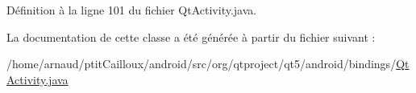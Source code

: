 Définition à la ligne 101 du fichier Qt\-Activity.\-java.



La documentation de cette classe a été générée à partir du fichier suivant \-:\begin{DoxyCompactItemize}
\item 
/home/arnaud/ptit\-Cailloux/android/src/org/qtproject/qt5/android/bindings/\hyperlink{_qt_activity_8java}{Qt\-Activity.\-java}\end{DoxyCompactItemize}
